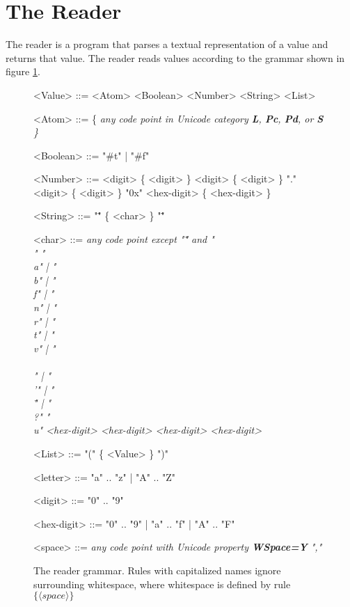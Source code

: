 \documentclass[a4paper]{article}
\begin{document}
\section{The Reader}

The reader is a program that parses a textual representation of a value and returns that value. The reader reads values according to the grammar shown in figure \ref{fig:readergrammar}.

\begin{figure}
\label{fig:readergrammar}
\caption{The reader grammar. Rules with capitalized names ignore surrounding whitespace, where whitespace is defined by rule $\{ \langle space \rangle \}$}
\begin{grammar}
<Value> ::= <Atom>
\alt <Boolean>
\alt <Number>
\alt <String>
\alt <List>

<Atom> ::= \{ \it{any code point in Unicode category {\bf L}, {\bf Pc}, {\bf Pd}, or {\bf S}} \}

<Boolean> ::= "#t" | "#f"

<Number> ::= <digit> \{ <digit> \}
\alt <digit> \{ <digit> \} "." <digit> \{ <digit> \}
\alt "0x" <hex-digit> \{ <hex-digit> \}

<String> ::= "\"" \{ <char> \} "\""

<char> ::= \it{any code point except "\"" and "\\"}
\alt "\\a" | "\\b" | "\\f" | "\\n" | "\\r" | "\\t" | "\\v" | "\\\\" | "\\'" | "\\\"" | "\\?"
\alt "\\u" <hex-digit> <hex-digit> <hex-digit> <hex-digit>

<List> ::= "(" \{ <Value> \} ")"

<letter> ::= "a" .. "z" | "A" .. "Z"

<digit> ::= "0" .. "9"

<hex-digit> ::= "0" .. "9" | "a" .. "f" | "A" .. "F"

<space> ::= \it{any code point with Unicode property {\bf WSpace=Y}}
\alt ","

\end{grammar}
\end{figure}
\end{document}
